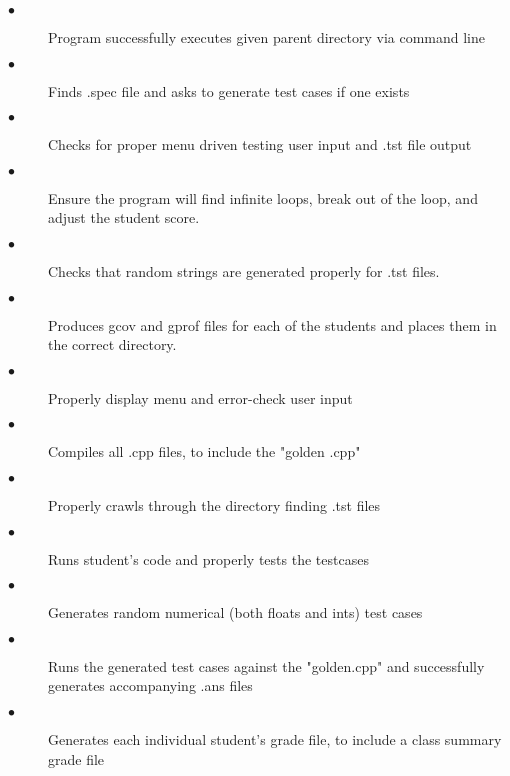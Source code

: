 \begin{description}
\item [$\bullet$] Program successfully executes given parent directory via command line
\item [$\bullet$] Finds .spec file and asks to generate test cases if one exists
\item [$\bullet$] Checks for proper menu driven testing user input and .tst file output
\item [$\bullet$] Ensure the program will find infinite loops, break out of the loop, and adjust the student score.
\item [$\bullet$] Checks that random strings are generated properly for .tst files.
\item [$\bullet$] Produces gcov and gprof files for each of the students and places them in the correct directory.
\item [$\bullet$] Properly display menu and error-check user input
\item [$\bullet$] Compiles all .cpp files, to include the "golden .cpp"
\item [$\bullet$] Properly crawls through the directory finding .tst files
\item [$\bullet$] Runs student's code and properly tests the testcases
\item [$\bullet$] Generates random numerical (both floats and ints) test cases 
\item [$\bullet$] Runs the generated test cases against the  "golden.cpp" and successfully generates accompanying .ans files
\item [$\bullet$] Generates each individual student's grade file, to include a class summary grade file
\end{description}

